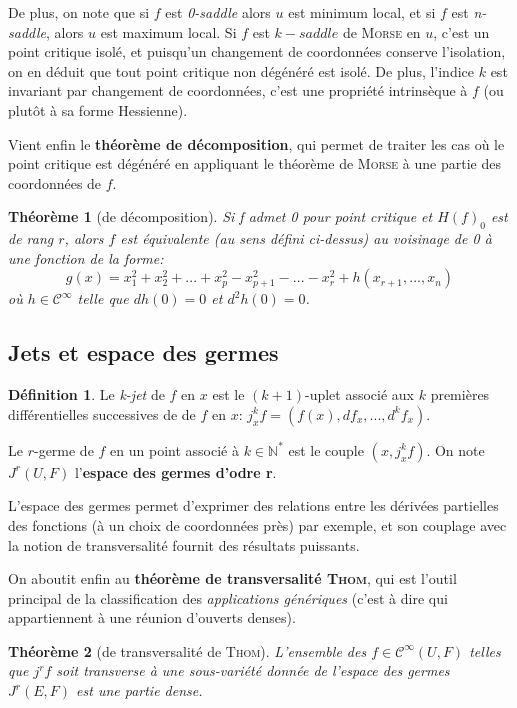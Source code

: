 \documentclass{article}
\newcommand{\cinf}{\mathcal{C}^\infty}
\newcommand{\N}{\mathbb{N}}
\newtheorem{thm}{Théorème}
\theoremstyle{definition}
\newtheorem{defn}{Définition}
\begin{document}
De plus, on note que si $f$ est \textit{0-saddle} alors $u$ est minimum local, et si $f$ est \textit{n-saddle}, alors $u$ est maximum local.
Si $f$ est $k-saddle$ de \textsc{Morse} en $u$, c'est un point critique isolé, et puisqu'un changement de coordonnées conserve l'isolation, on en déduit que tout point critique non dégénéré est isolé.
De plus, l'indice $k$ est invariant par changement de coordonnées, c'est une propriété intrinsèque à $f$ (ou plutôt à sa forme Hessienne).

Vient enfin le \textbf{théorème de décomposition}, qui permet de traiter les cas où le point critique est dégénéré en appliquant le théorème de \textsc{Morse} à une partie des coordonnées de $f$.
\begin{thm}[de décomposition]
	Si f admet 0 pour point critique et $H(f)_0$ est de rang $r$, alors $f$ est équivalente (au sens défini ci-dessus) au voisinage de 0 à une fonction de la forme:
	$$g(x)= x_1^2+x_2^2+ ...+x_p^2-x_{p+1}^2 -...- x_r^2 + h(x_{r+1},...,x_n)$$
	où $h\in\cinf$ telle que $dh(0)=0$ et $d^2h(0)=0$.
\end{thm}

\subsection{Jets et espace des germes}
\begin{defn}
	Le \textit{k-jet} de $f$ en $x$ est le $(k+1)$-uplet associé aux $k$ premières différentielles successives de de $f$ en $x$: $j^k_x f = \left(f(x), df_x, ..., d^kf_x\right)$.

	Le $r$-germe de $f$ en un point associé à $k\in\N^*$ est le couple $(x,j^k_x f)$. On note $J^r(U,F)$ l'\textbf{espace des germes d'odre r}.
\end{defn}

L'espace des germes permet d'exprimer des relations entre les dérivées partielles des fonctions (à un choix de coordonnées près) par exemple, et son couplage avec la notion de transversalité fournit des résultats puissants.

On aboutit enfin au \textbf{théorème de transversalité \textsc{Thom}}, qui est l'outil principal de la classification des \textit{applications génériques} (c'est à dire qui appartiennent à une réunion d'ouverts denses).
\begin{thm}[de transversalité de \textsc{Thom}]
	L'ensemble des $f\in\cinf(U,F)$ telles que $j^rf$ soit transverse à une sous-variété donnée de l'espace des germes $J^r(E,F)$ est une partie dense.
\end{thm}
\end{document}
